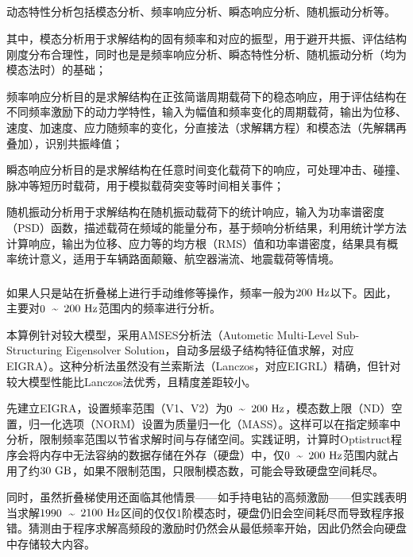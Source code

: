 \documentclass[12pt, oneside, a4paper]{ctexart}
\begin{document}
\subsection{}
\par{}
动态特性分析包括模态分析、频率响应分析、瞬态响应分析、随机振动分析等。
\par{}
其中，模态分析用于求解结构的固有频率和对应的振型，用于避开共振、评估结构刚度分布合理性，同时也是是频率响应分析、瞬态特性分析、随机振动分析（均为模态法时）的基础；
\par{}
频率响应分析目的是求解结构在正弦简谐周期载荷下的稳态响应，用于评估结构在不同频率激励下的动力学特性，输入为幅值和频率变化的周期载荷，输出为位移、速度、加速度、应力随频率的变化，分直接法（求解耦方程）和模态法（先解耦再叠加），识别共振峰值；
\par{}
瞬态响应分析目的是求解结构在任意时间变化载荷下的响应，可处理冲击、碰撞、脉冲等短历时载荷，用于模拟载荷突变等时间相关事件；
\par{}
随机振动分析用于求解结构在随机振动载荷下的统计响应，输入为功率谱密度（PSD）函数，描述载荷在频域的能量分布，基于频响分析结果，利用统计学方法计算响应，输出为位移、应力等的均方根（RMS）值和功率谱密度，结果具有概率统计意义，适用于车辆路面颠簸、航空器湍流、地震载荷等情境。
\subsubsection{}
\par{}
如果人只是站在折叠梯上进行手动维修等操作，频率一般为$\rm 200~Hz$以下。因此，主要对$\rm 0$~\textasciitilde~$\rm 200~Hz$范围内的频率进行分析。
\par{}
本算例针对较大模型，采用AMSES分析法（Autometic Multi-Level Sub-Structuring Eigensolver Solution，自动多层级子结构特征值求解，对应EIGRA）。这种分析法虽然没有兰索斯法（Lanczos，对应EIGRL）精确，但针对较大模型性能比Lanczos法优秀，且精度差距较小。
\par{}
先建立EIGRA，设置频率范围（V1、V2）为$\rm 0$~\textasciitilde~$\rm 200~Hz$，模态数上限（ND）空置，归一化选项（NORM）设置为质量归一化（MASS）。这样可以在指定频率中分析，限制频率范围以节省求解时间与存储空间。实践证明，计算时Optistruct程序会将内存中无法容纳的数据存储在外存（硬盘）中，仅$\rm 0$~\textasciitilde~$\rm 200~Hz$范围内就占用了约$\rm 30~GB$，如果不限制范围，只限制模态数，可能会导致硬盘空间耗尽。
\par{}
同时，虽然折叠梯使用还面临其他情景——如手持电钻的高频激励——但实践表明当求解$\rm 1990$~\textasciitilde~$\rm 2100~Hz$区间的仅仅1阶模态时，硬盘仍旧会空间耗尽而导致程序报错。猜测由于程序求解高频段的激励时仍然会从最低频率开始，因此仍然会向硬盘中存储较大内容。
\end{document}
